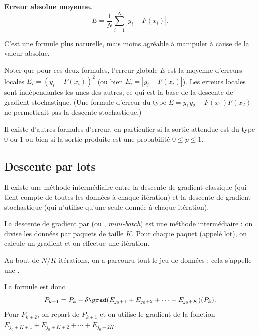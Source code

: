 \textbf{Erreur absolue moyenne.}
$$E = \frac{1}{N} \sum_{i=1}^N |y_i-F(x_i)|.$$

C'est une formule plus naturelle, mais moins agréable à manipuler à cause de la valeur absolue.

Noter que pour ces deux formules, l'erreur globale $E$ est la moyenne d'erreurs locales $E_i = (y_i-F(x_i))^2$ (ou bien $E_i = |y_i-F(x_i)|$).
Les erreurs locales sont indépendantes les unes des autres, ce qui est la base de la descente de gradient stochastique.
(Une formule d'erreur du type $E = y_1y_2 - F(x_1)F(x_2)$ ne permettrait pas la descente stochastique.)

Il existe d'autres formules d'erreur, en particulier si la sortie attendue est du type $0$ ou $1$ ou bien si la sortie produite est une probabilité $0\le p \le 1$. 


\subsection{Descente par lots}
\label{ssec:lot}


Il existe une méthode intermédiaire entre la descente de gradient classique (qui tient compte de toutes les données à chaque itération)
et la descente de gradient stochastique (qui n'utilise qu'une seule donnée à chaque itération).

La descente de gradient par   (ou  , \emph{mini-batch}) est une méthode intermédiaire : on divise les données par paquets de taille $K$. Pour chaque paquet (appelé \og{}lot\fg{}), on calcule un gradient et on effectue une itération.

Au bout de $N/K$ itérations, on a parcouru tout le jeu de données : cela s'appelle une  .



La formule est donc
$$P_{k+1} = P_k - \delta \grad (E_{j_0+1}+E_{j_0+2}+\cdots+E_{j_0+K}) (P_k).$$
Pour $P_{k+2}$, on repart de $P_{k+1}$ et on utilise le gradient de la fonction $E_{j_0+K+1}+E_{j_0+K+2}+\cdots+E_{j_0+2K}$.



